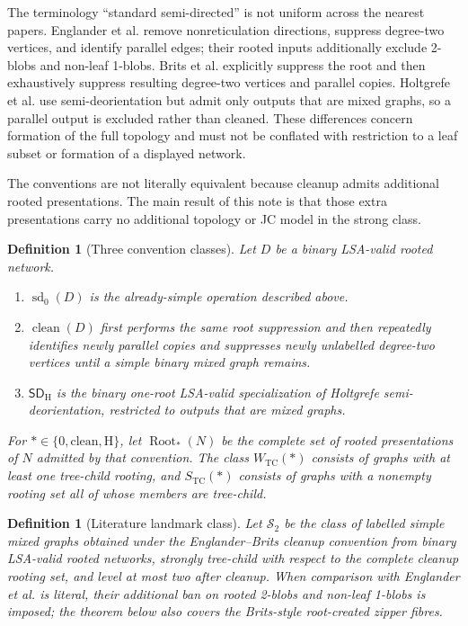 \documentclass[11pt]{article}
\newtheorem{definition}[theorem]{Definition}
\theoremstyle{remark}\newtheorem{remark}[theorem]{Remark}
\newcommand{\STC}{S_{\mathrm{TC}}}
\newcommand{\WTC}{W_{\mathrm{TC}}}
\begin{document}
The terminology ``standard semi-directed'' is not uniform across the nearest papers.  Englander et al. remove nonreticulation directions, suppress degree-two vertices, and identify parallel edges; their rooted inputs additionally exclude 2-blobs and non-leaf 1-blobs.  Brits et al. explicitly suppress the root and then exhaustively suppress resulting degree-two vertices and parallel copies.  Holtgrefe et al. use semi-deorientation but admit only outputs that are mixed graphs, so a parallel output is excluded rather than cleaned.  These differences concern formation of the full topology and must not be conflated with restriction to a leaf subset or formation of a displayed network.

The conventions are not literally equivalent because cleanup admits additional rooted presentations.  The main result of this note is that those extra presentations carry no additional topology or JC model in the strong class.

\begin{definition}[Three convention classes]\label{def:classes}
Let $D$ be a binary LSA-valid rooted network.
\begin{enumerate}[label=(\roman*)]
\item $\operatorname{sd}_0(D)$ is the already-simple operation described above.
\item $\operatorname{clean}(D)$ first performs the same root suppression and then repeatedly identifies newly parallel copies and suppresses newly unlabelled degree-two vertices until a simple binary mixed graph remains.
\item $\mathsf{SD}_{\mathrm H}$ is the binary one-root LSA-valid specialization of Holtgrefe semi-deorientation, restricted to outputs that are mixed graphs.
\end{enumerate}
For $*\in\{0,\mathrm{clean},\mathrm H\}$, let $\operatorname{Root}_*(N)$ be the complete set of rooted presentations of $N$ admitted by that convention.  The class $\WTC(*)$ consists of graphs with at least one tree-child rooting, and $\STC(*)$ consists of graphs with a nonempty rooting set all of whose members are tree-child.
\end{definition}

\begin{definition}[Literature landmark class]\label{def:S2}
Let $\mathcal S_2$ be the class of labelled simple mixed graphs obtained under the Englander--Brits cleanup convention from binary LSA-valid rooted networks, strongly tree-child with respect to the complete cleanup rooting set, and level at most two after cleanup.  When comparison with Englander et al. is literal, their additional ban on rooted 2-blobs and non-leaf 1-blobs is imposed; the theorem below also covers the Brits-style root-created zipper fibres.
\end{definition}
\end{document}
